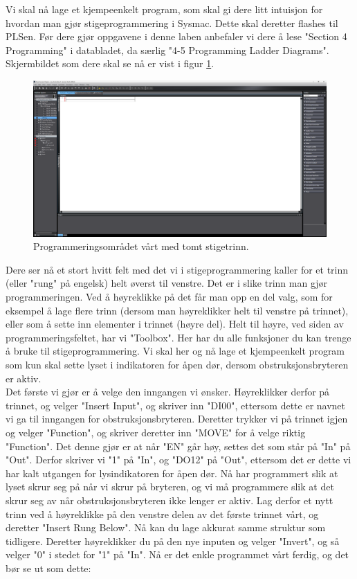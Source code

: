 \begin{alphasection}
Vi skal nå lage et kjempeenkelt program, som skal gi dere litt intuisjon for hvordan man gjør stigeprogrammering i Sysmac. Dette skal deretter flashes til PLSen. Før dere gjør oppgavene i denne laben anbefaler vi dere å lese "Section 4 Programming" i databladet, da særlig "4-5 Programming Ladder Diagrams". Skjermbildet som dere skal se nå er vist i figur \ref{fig:empty_rung}.

\begin{figure}[ht]
    \centering
    \includegraphics[scale=0.2]{figures/empty_rung.png}
    \caption{Programmeringsområdet vårt med tomt stigetrinn.}
    \label{fig:empty_rung}
\end{figure}

Dere ser nå et stort hvitt felt med det vi i stigeprogrammering kaller for et trinn (eller "rung" på engelsk) helt øverst til venstre. Det er i slike trinn man gjør programmeringen. Ved å høyreklikke på det får man opp en del valg, som for eksempel å lage flere trinn (dersom man høyreklikker helt til venstre på trinnet), eller som å sette inn elementer i trinnet (høyre del). Helt til høyre, ved siden av programmeringsfeltet, har vi "Toolbox". Her har du alle funksjoner du kan trenge å bruke til stigeprogrammering. Vi skal her og nå lage et kjempeenkelt program som kun skal sette lyset i indikatoren for åpen dør, dersom obstruksjonsbryteren er aktiv.\\

Det første vi gjør er å velge den inngangen vi ønsker. Høyreklikker derfor på trinnet, og velger "Insert Input", og skriver inn "DI00", ettersom dette er navnet vi ga til inngangen for obstruksjonsbryteren. Deretter trykker vi på trinnet igjen og velger "Function", og skriver deretter inn "MOVE" for å velge riktig "Function". Det denne gjør er at når "EN" går høy, settes det som står på "In" på "Out". Derfor skriver vi "1" på "In", og "DO12" på "Out", ettersom det er dette vi har kalt utgangen for lysindikatoren for åpen dør. Nå har programmert slik at lyset skrur seg på når vi skrur på bryteren, og vi må programmere slik at det skrur seg av når obstruksjonsbryteren ikke lenger er aktiv. Lag derfor et nytt trinn ved å høyreklikke på den venstre delen av det første trinnet vårt, og deretter "Insert Rung Below". Nå kan du lage akkurat samme struktur som tidligere. Deretter høyreklikker du på den nye inputen og velger "Invert", og så velger "0" i stedet for "1" på "In". Nå er det enkle programmet vårt ferdig, og det bør se ut som dette:


\end{alphasection}
